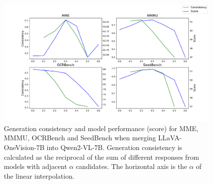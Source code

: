 \begin{figure}[h]
    \centering
    \includegraphics[width=\linewidth, bb=0 0 1007 576]{figure/consistency_acc4.pdf}
    \caption{Generation consistency and model performance (score) for MME, MMMU, OCRBench and SeedBench when merging LLaVA-OneVision-7B into Qwen2-VL-7B. Generation consistency is calculated as the reciprocal of the sum of different responses from models with adjacent $\alpha$ candidates. The horizontal axis is the $\alpha$ of the linear interpolation.}
    \label{fig:consistency_acc4}
\end{figure}




% 






% 